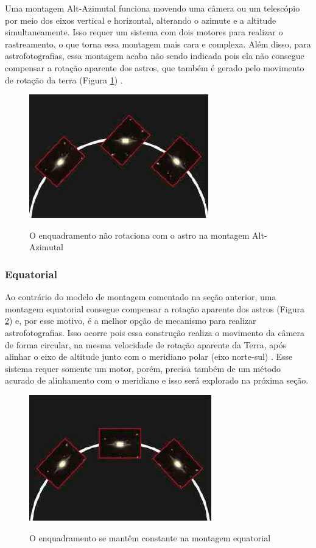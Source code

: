 Uma montagem Alt-Azimutal funciona movendo uma câmera ou um telescópio por meio dos eixos vertical e horizontal, alterando o azimute e a altitude simultaneamente. Isso requer um sistema com dois motores para realizar o rastreamento, o que torna essa montagem mais cara e complexa. Além disso, para astrofotografias, essa montagem acaba não sendo indicada pois ela não consegue compensar a rotação aparente dos astros, que também é gerado pelo movimento de rotação da terra (Figura \ref{fig:altazimuterotation}) \cite{book:bbcsky}. 

\begin{figure}[!htb]
	\centering
	\caption{O enquadramento não rotaciona com o astro na montagem Alt-Azimutal}
	\includegraphics[width=0.45\linewidth]{figuras/altazimuterotation}
	\label{fig:altazimuterotation}
\end{figure}


\subsubsection{Equatorial}

Ao contrário do modelo de montagem comentado na seção anterior, uma montagem equatorial consegue compensar a rotação aparente dos astros (Figura \ref{fig:equatorialrotation}) e, por esse motivo, é a melhor opção de mecanismo para realizar astrofotografias. Isso ocorre pois essa construção realiza o movimento da câmera de forma circular, na mesma velocidade de rotação aparente da Terra, após alinhar o eixo de altitude junto com o meridiano polar (eixo norte-sul) \cite{book:bbcsky}. Esse sistema requer somente um motor, porém, precisa também de um método acurado de alinhamento com o meridiano e isso será explorado na próxima seção. 

\begin{figure}[!htb]
	\centering
	\caption{O enquadramento se mantêm constante na montagem equatorial}
	\includegraphics[width=0.45\linewidth]{figuras/equatorialrotation}
	\label{fig:equatorialrotation}
\end{figure}

